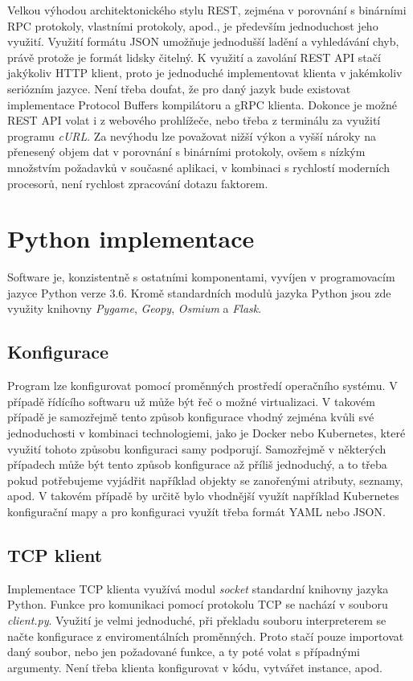 \documentclass[czech, bachelor]{diploma}
\begin{document}
Velkou výhodou architektonického stylu REST, zejména v porovnání s binárními RPC protokoly, vlastními protokoly, apod., je
především jednoduchost jeho využití. Využití formátu JSON umožňuje jednodušší ladění a vyhledávání chyb, právě protože je formát
lidsky čitelný. K využití a zavolání REST API stačí jakýkoliv HTTP klient, proto je jednoduché implementovat klienta v jakémkoliv
seriózním jazyce. Není třeba doufat, že pro daný jazyk bude existovat implementace Protocol Buffers kompilátoru a gRPC klienta.
Dokonce je možné REST API volat i z webového prohlížeče, nebo třeba z terminálu za využití programu \emph{cURL}. Za nevýhodu lze
považovat nižší výkon a vyšší nároky na přenesený objem dat v porovnání s binárními protokoly, ovšem s nízkým množstvím požadavků
v současné aplikaci, v kombinaci s rychlostí moderních procesorů, není rychlost zpracování dotazu faktorem.

\section{Python implementace}

Software je, konzistentně s ostatními komponentami, vyvíjen v programovacím jazyce Python verze 3.6. Kromě standardních modulů
jazyka Python jsou zde využity knihovny \emph{Pygame}, \emph{Geopy}, \emph{Osmium} a \emph{Flask}.

\subsection{Konfigurace}

Program lze konfigurovat pomocí proměnných prostředí operačního systému. V případě řídícího softwaru už může být řeč o možné
virtualizaci. V takovém případě je samozřejmě tento způsob konfigurace vhodný zejména kvůli své jednoduchosti v kombinaci
technologiemi, jako je Docker nebo Kubernetes, které využití tohoto způsobu konfiguraci samy podporují. Samozřejmě v některých
případech může být tento způsob konfigurace až příliš jednoduchý, a to třeba pokud potřebujeme vyjádřit například objekty
se zanořenými atributy, seznamy, apod. V takovém případě by určitě bylo vhodnější využít například Kubernetes konfigurační mapy
a pro konfiguraci využít třeba formát YAML nebo JSON.

\subsection{TCP klient}

Implementace TCP klienta využívá modul \emph{socket} standardní knihovny jazyka Python. Funkce pro komunikaci pomocí protokolu TCP
se nachází v souboru \emph{client.py}. Využití je velmi jednoduché, při překladu souboru interpreterem se načte konfigurace
z enviromentálních proměnných. Proto stačí pouze importovat daný soubor, nebo jen požadované funkce, a ty poté volat s případnými
argumenty. Není třeba klienta konfigurovat v kódu, vytvářet instance, apod.
\end{document}
